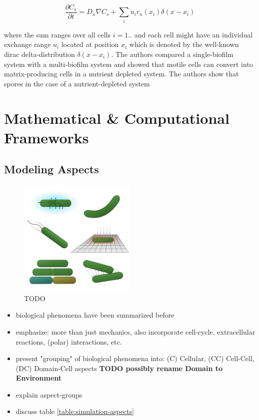 \documentclass{article}
\begin{document}
\begin{equation}
    \frac{\partial C_s}{\partial t} = D_n \nabla C_s  + \sum\limits_i u_i r_n (x_i) \delta(x-x_i)
\end{equation}

where the sum ranges over all cells $i=1..$ and each cell might have an individual exchange range $u_i$ located at position $x_i$ which is denoted by the well-known dirac delta-distribution $\delta(x-x_i)$.
The authors compared a single-biofilm system with a multi-biofilm system and showed that motile cells can convert into matrix-producing cells in a nutrient depleted system.
The authors show that spores in the case of a nutrient-depleted system

\section{Mathematical \& Computational Frameworks}

\subsection{Modeling Aspects}

\begin{figure}
    \centering
    \includegraphics[width=0.5\textwidth]{figures/concept-figure.png}
    \caption{TODO}
    \label{fig:concept-figure-aspects}
\end{figure}

\begin{itemize}
    \item biological phenomena have been summarized before
    \item emphasize: more than just mechanics, also incorporate cell-cycle, extracellular
        reactions, (polar) interactions, etc.
    \item present "grouping" of biological phenomena into: (C) Cellular, (CC) Cell-Cell, (DC)
        Domain-Cell aspects \textbf{TODO possibly rename Domain to Environment}
    \item explain aspect-groups
    \item discuss table \ref{table:simulation-aspects}
\end{itemize}
\end{document}
